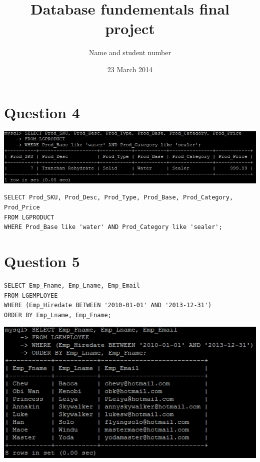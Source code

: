\documentclass[a4paper,10pt]{article}
\title{Database fundementals final project}
\author{Name and student number}
\date{23 March 2014}
\begin{document}
\maketitle
\section*{Question 4}
\includegraphics{Queries/Question_4/Q4_screenshot.jpg}
\lstset{
            language=SQL,
            breaklines=true
            }
        \begin{lstlisting}[frame=single]
        SELECT Prod_SKU, Prod_Desc, Prod_Type, Prod_Base, Prod_Category, Prod_Price
FROM LGPRODUCT
WHERE Prod_Base like 'water' AND Prod_Category like 'sealer';

        \end{lstlisting}
\section*{Question 5}
\lstset{
            language=SQL,
            breaklines=true
            }
        \begin{lstlisting}[frame=single]
        SELECT Emp_Fname, Emp_Lname, Emp_Email
FROM LGEMPLOYEE
WHERE (Emp_Hiredate BETWEEN '2010-01-01' AND '2013-12-31')
ORDER BY Emp_Lname, Emp_Fname;

        \end{lstlisting}
\includegraphics{Queries/Question_5/Q5_screenshot.jpg}
\end{document}
